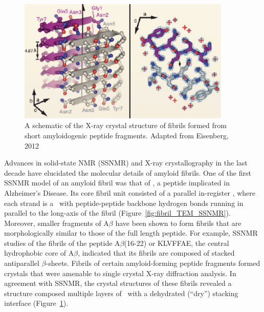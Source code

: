 \begin{figure}
 \centering
 \includegraphics[width=4in]{figures/introduction/fibril_xray_model.pdf}
 \caption[X-ray crystal structure of an amyloid fibril]{A schematic of the X-ray crystal structure of fibrils formed from short amyloidogenic peptide fragments. Adapted from Eisenberg, 2012}
 \label{fig:fibril_xray_model}
\end{figure}


Advances in solid-state NMR (SSNMR) and X-ray crystallography in the last decade have elucidated the molecular details of amyloid fibrils. One of the first SSNMR model of an amyloid fibril was that of , a peptide implicated in Alzheimer's Disease.\cite{Petkova:2006gx}
Its core fibril unit consisted of a parallel in-register \bsheet, where each strand is a \bhairpin\ with peptide-peptide backbone hydrogen bonds running in parallel to the long-axis of the fibril (Figure~\ref{fig:fibril_TEM_SSNMR}).  Moreover, smaller fragments of A$\beta$ have been shown to form fibrils that are morphologically similar to those of the full length peptide. For example, SSNMR studies of the fibrils of the peptide A$\beta$(16-22) or KLVFFAE, the central hydrophobic core of A$\beta$, indicated that its fibrils are composed of stacked antiparallel $\beta$-sheets.\cite{Balbach:2000vf} Fibrils of certain amyloid-forming peptide fragments formed crystals that were amenable to single crystal X-ray diffraction analysis.\cite{Eisenberg:2012hm}  In agreement with SSNMR, the crystal structures of these fibrils revealed a structure composed multiple layers of \bsheet\ with a dehydrated (``dry'') stacking interface (Figure~\ref{fig:fibril_xray_model}).\cite{Sawaya:2007p4363,Eisenberg:2012hm}

